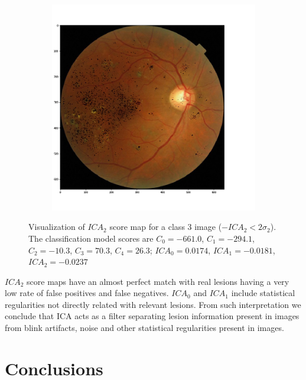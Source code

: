 \documentclass[review]{elsarticle}
\theoremstyle{definition} %
\theoremstyle{remark}
\begin{document}
\begin{figure}[h!]
	\centering
	\begin{subfigure}[b]{\textwidth}
		\centering
		\includegraphics[width=\textwidth]{./figures/c3/retina_mICA2.png}
	\end{subfigure}
	\caption{Visualization of $ICA_2$ score map for a class 3 image ($-ICA_2 < 2 \sigma_2$). The classification model scores are $C_0 = -661.0$, $C_1 = -294.1$,  $C_2 = -10.3$,   $C_3 = 70.3$,   $C_4 = 26.3$; $ICA_0 = 0.0174$, $ICA_1 = -0.0181$, $ICA_2 = -0.0237$}  
	\label{fig:ica_components_c3} 
\end{figure}

$ICA_2$ score maps have an almost perfect match with real lesions having a very low rate of false positives and false negatives. $ICA_0$ and $ICA_1$ include statistical regularities not directly related with relevant lesions. From such interpretation we conclude that ICA acts as a filter separating lesion information present in images from blink artifacts, noise and other statistical regularities present in images.

\section{Conclusions}\label{sec:conclusions}
\end{document}
